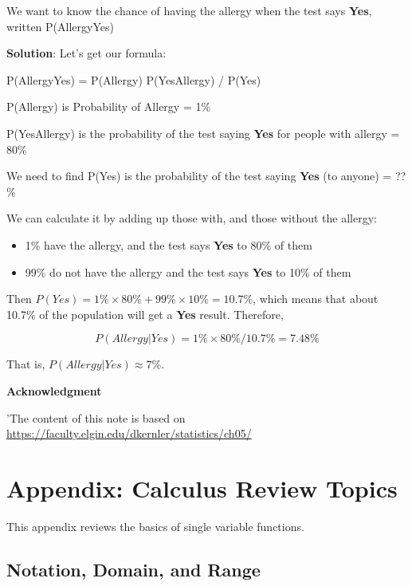 \documentclass[
]{book}
\begin{document}
We want to know the chance of having the allergy when the test says \textbf{Yes}, written P(Allergy\textbar Yes)

\textbf{Solution}: Let's get our formula:

P(Allergy\textbar Yes) = P(Allergy) P(Yes\textbar Allergy) / P(Yes)

P(Allergy) is Probability of Allergy = 1\%

P(Yes\textbar Allergy) is the probability of the test saying \textbf{Yes} for people with allergy = 80\%

We need to find P(Yes) is the probability of the test saying \textbf{Yes} (to anyone) = ??\%

We can calculate it by adding up those with, and those without the allergy:

\begin{itemize}
\item
  1\% have the allergy, and the test says \textbf{Yes} to 80\% of them
\item
  99\% do not have the allergy and the test says \textbf{Yes} to 10\% of them
\end{itemize}

Then \(P(Yes) = 1\% \times 80\% + 99\% \times 10\% = 10.7\%\), which means that about 10.7\% of the population will get a \textbf{Yes} result. Therefore,

\[P(Allergy|Yes) =  1\% \times 80\% / 10.7\% = 7.48\%\]

That is, \(P(Allergy|Yes) \approx 7\%\).

\hfill\break

\hfill\break

\textbf{Acknowledgment}

'The content of this note is based on \url{https://faculty.elgin.edu/dkernler/statistics/ch05/}

\hfill\break

\hfill\break

\hypertarget{appendix-calculus-review-topics}{%
\section{Appendix: Calculus Review Topics}\label{appendix-calculus-review-topics}}

This appendix reviews the basics of single variable functions.

\hypertarget{notation-domain-and-range}{%
\subsection{Notation, Domain, and Range}\label{notation-domain-and-range}}
\end{document}
